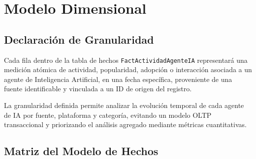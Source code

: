 \documentclass[12pt,a4paper]{article}
\begin{document}
\section{Modelo Dimensional}

\subsection{Declaración de Granularidad}

Cada fila dentro de la tabla de hechos \texttt{FactActividadAgenteIA} representará una medición atómica de actividad, popularidad, adopción o interacción asociada a un agente de Inteligencia Artificial, en una fecha específica, proveniente de una fuente identificable y vinculada a un ID de origen del registro.

La granularidad definida permite analizar la evolución temporal de cada agente de IA por fuente, plataforma y categoría, evitando un modelo OLTP transaccional y priorizando el análisis agregado mediante métricas cuantitativas.

\subsection{Matriz del Modelo de Hechos}

\small
{}
\end{document}
